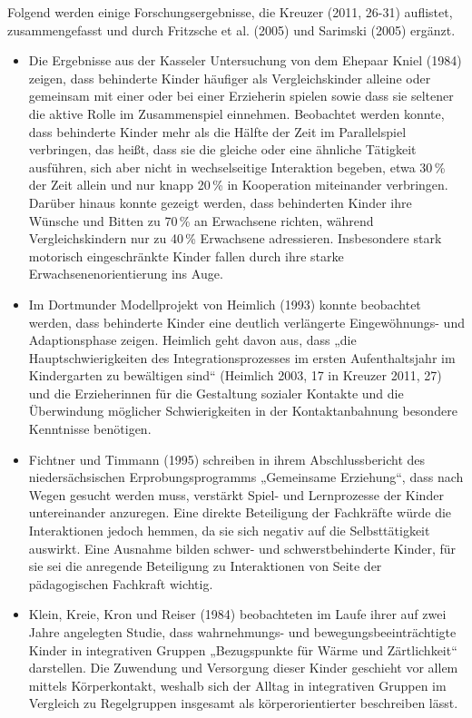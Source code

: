 Folgend werden einige Forschungsergebnisse, die Kreuzer (2011, 26-31) auflistet, zusammengefasst und durch Fritzsche et al. (2005) und Sarimski (2005) ergänzt. 

\begin{itemize}
\item Die Ergebnisse aus der Kasseler Untersuchung von dem Ehepaar Kniel (1984) zeigen, dass behinderte Kinder häufiger als Vergleichskinder alleine oder gemeinsam mit einer oder bei einer Erzieherin spielen sowie dass sie seltener die aktive Rolle im Zusammenspiel einnehmen. Beobachtet werden konnte, dass behinderte Kinder mehr als die Hälfte der Zeit im Parallelspiel verbringen, das heißt, dass sie die gleiche oder eine ähnliche Tätigkeit ausführen, sich aber nicht in wechselseitige Interaktion begeben, etwa 30\,\% der Zeit allein und nur knapp 20\,\% in Kooperation miteinander verbringen. Darüber hinaus konnte gezeigt werden, dass behinderten Kinder ihre Wünsche und Bitten zu 70\,\% an Erwachsene richten, während Vergleichskindern nur zu 40\,\% Erwachsene adressieren. Insbesondere stark motorisch eingeschränkte Kinder fallen durch ihre starke Erwachsenenorientierung ins Auge. 

\item Im Dortmunder Modellprojekt von Heimlich (1993) konnte beobachtet werden, dass behinderte Kinder eine deutlich verlängerte Eingewöhnungs- und Adaptions\-phase zeigen. Heimlich geht davon aus, dass „die Hauptschwierigkeiten des Integrationsprozesses im ersten Aufenthaltsjahr im Kindergarten zu bewältigen sind“ (Heimlich 2003, 17 in Kreuzer 2011, 27) und die Erzieherinnen für die Gestaltung sozialer Kontakte und die Überwindung möglicher Schwierigkeiten in der Kontaktanbahnung besondere Kenntnisse benötigen.

\item Fichtner und Timmann (1995) schreiben in ihrem Abschlussbericht des niedersächsischen Erprobungsprogramms „Gemeinsame Erziehung“, dass nach Wegen gesucht werden muss, verstärkt Spiel- und Lernprozesse der Kinder untereinander anzuregen. Eine direkte Beteiligung der Fachkräfte würde die Interaktionen jedoch hemmen, da sie sich negativ auf die Selbsttätigkeit auswirkt. Eine Ausnahme bilden schwer- und schwerstbehinderte Kinder, für sie sei die anregende Beteiligung zu Interaktionen von Seite der pädagogischen Fachkraft wichtig. 

\item Klein, Kreie, Kron und Reiser (1984) beobachteten im Laufe ihrer auf zwei Jahre angelegten Studie, dass wahrnehmungs- und bewegungsbeeinträchtigte Kinder in integrativen Gruppen „Bezugspunkte für Wärme und Zärtlichkeit“ darstellen. Die Zuwendung und Versorgung dieser Kinder geschieht vor allem mittels Körperkontakt, weshalb sich der Alltag in integrativen Gruppen im Vergleich zu Regelgruppen insgesamt als körperorientierter beschreiben lässt. 


\end{itemize}
